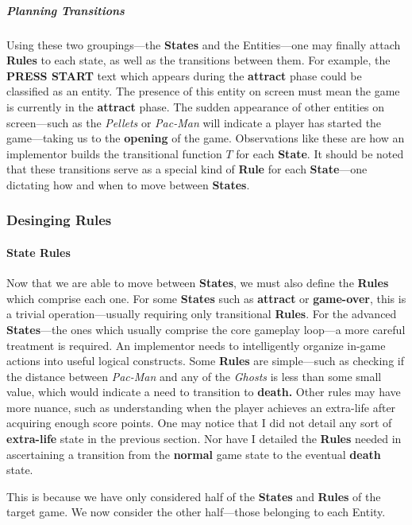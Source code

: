 \documentclass{report}
\newcommand{\state}[1]{\textbf{#1}}
\newcommand{\rules}{\textbf{Rules}\xspace}
\newcommand{\imp}{implementor\xspace}
\begin{document}
\subparagraph{Planning Transitions}

Using these two groupings---the \state{States} and the Entities---one may finally attach \rules to each state, as well as the transitions between them. For example, the \textbf{PRESS START} text which appears during the \state{attract} phase could be classified as an entity. The presence of this entity on screen must mean the game is currently in the \state{attract} phase. The sudden appearance of other entities on screen---such as the \emph{Pellets} or \emph{Pac-Man} will indicate a player has started the game---taking us to the \state{opening} of the game. Observations like these are how an \imp builds the transitional function $T$ for each \state{State}. It should be noted that these transitions serve as a special kind of \state{Rule} for each \state{State}---one dictating how and when to move between \state{States}.

\subsubsection{Desinging \state{Rules}}

\paragraph{State Rules}

Now that we are able to move between \state{States}, we must also define the \rules which comprise each one. For some \state{States} such as \state{attract} or \state{game-over}, this is a trivial operation---usually requiring only transitional \rules. For the advanced \state{States}---the ones which usually comprise the core gameplay loop---a more careful treatment is required. An \imp needs to intelligently organize in-game actions into useful logical constructs. Some \rules are simple---such as checking if the distance between \emph{Pac-Man} and any of the \emph{Ghosts} is less than some small value, which would indicate a need to transition to \state{death.} Other rules may have more nuance, such as understanding when the player achieves an extra-life after acquiring enough score points.
One may notice that I did not detail any sort of \state{extra-life} state in the previous section. Nor have I detailed the \rules needed in ascertaining a transition from the \state{normal} game state to the eventual \state{death} state. 

This is because we have only considered half of the \state{States} and \rules of the target game. We now consider the other half---those belonging to each Entity. 
\end{document}
